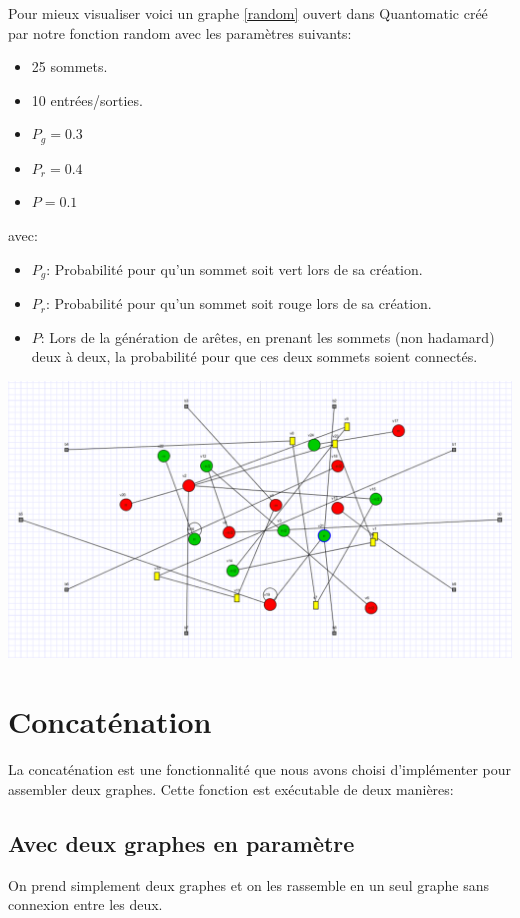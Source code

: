 \documentclass[a4paper,oneside]{book}
\begin{document}
Pour mieux visualiser voici un graphe \ref{random} ouvert dans Quantomatic créé par notre fonction random avec les paramètres suivants:

\begin{itemize}
\item 25 sommets.
\item 10 entrées/sorties.
\item $P_{g} = 0.3$
\item $P_{r} = 0.4 $
\item $P = 0.1 $
\end{itemize}
avec:
\begin{itemize}
\item $P_{g}$: Probabilité pour qu'un sommet soit vert lors de sa création.
\item $P_{r}$: Probabilité pour qu'un sommet soit rouge lors de sa création.
\item $P$: Lors de la génération de arêtes, en prenant les sommets (non hadamard) deux à deux, la probabilité pour que ces deux sommets soient connectés.
\end{itemize}


\begin{center}
\includegraphics[scale=0.51]{IMG/random.eps}
\label{random}
\end{center}

\newpage
\section{Concaténation}
La concaténation est une fonctionnalité que nous avons choisi d'implémenter pour assembler deux graphes. Cette fonction est exécutable de deux manières:

\subsection{Avec deux graphes en paramètre}
On prend simplement deux graphes et on les rassemble en un seul graphe sans connexion entre les deux.
\end{document}
